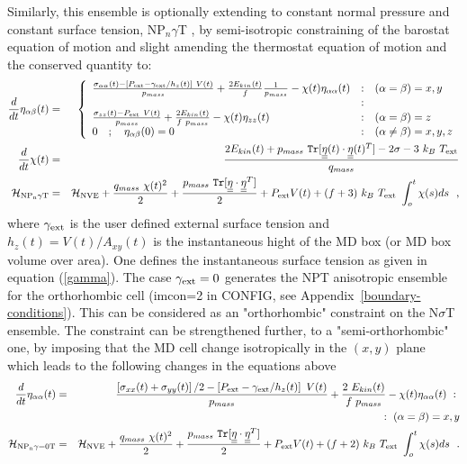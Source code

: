 Similarly, this ensemble is optionally extending to constant
normal pressure and constant surface tension, NP$_{n}\gamma$T
\cite{ikeguchi-04a}, by semi-isotropic constraining of the
barostat equation of motion and slight amending the thermostat
equation of motion and the conserved quantity to:
\begin{eqnarray}
\frac{d}{dt} \eta_{\alpha\beta}(t) &=& \left\{ \begin{array} {l@{\quad:\quad}l}
\frac{\sigma_{\alpha\alpha}(t) - \left[ P_{\rm ext} - \gamma_{\rm ext} / h_{z}(t) \right]~V(t)}{p_{mass}} +
\frac{2 E_{kin}(t)}{f} \frac{1}{p_{mass}} - \chi(t) \eta_{\alpha\alpha}(t) & (\alpha = \beta) = x,y \\
& \\
\frac{\sigma_{zz}(t) - P_{\rm ext}~V(t)}{p_{mass}} +
\frac{2 E_{kin}(t)}{f~p_{mass}} - \chi(t) \eta_{zz}(t) & (\alpha = \beta) = z \\
0~~~;~~~\eta_{\alpha\beta}(0) = 0 & (\alpha \ne \beta) = x,y,z
\end{array} \right. \nonumber \\
\frac{d}{dt} \chi(t) &=& \frac{2 E_{kin}(t) + p_{mass}~{\tt Tr}[\mat{\eta}(t) \cdot
\mat{\eta}(t)^{T}] - 2 \sigma - 3~k_{B}~T_{\rm ext}}{q_{mass}} \\
{\cal H}_{\rm NP_{n}\gamma T} &=& {\cal H}_{\rm NVE} + {q_{mass}~\chi (t)^{2} \over 2} +
{p_{mass}~{\tt Tr}[\mat{\eta} \cdot \mat{\eta}^{T}] \over 2} + P_{\rm ext} V(t) +
(f+3)~k_{B}~T_{\rm ext}~\int_o^t \chi (s) ds~~, \nonumber
\end{eqnarray}
where $\gamma_{\rm ext}$ is the user defined external surface tension
and $h_{z}(t) = V(t) / A_{xy}(t)$ is the instantaneous hight of the
MD box (or MD box volume over area).  One defines the instantaneous surface
tension as given in equation (\ref{gamma}).  The case $\gamma_{\rm ext}=0$
generates the NPT anisotropic ensemble for the orthorhombic cell
(imcon=2 in CONFIG, see Appendix~\ref{boundary-conditions}).  This
can be considered as an "orthorhombic" constraint on the N$\sigma$T ensemble.
The constraint can be strengthened further, to a "semi-orthorhombic" one, by
imposing that the MD cell change isotropically in the $(x,y)$ plane which
leads to the following changes in the equations above
\begin{eqnarray}
\frac{d}{dt} \eta_{\alpha\alpha}(t) &=& \frac{\left[\sigma_{xx}(t)+\sigma_{yy}(t)\right]/2 -
\left[ P_{\rm ext} - \gamma_{\rm ext} / h_{z}(t) \right]~V(t)}{p_{mass}} + \frac{2~E_{kin}(t)}{f~p_{mass}} -
\chi (t) \eta_{\alpha\alpha}(t)~:~\nonumber \\
 & & \phantom{xxxxxxxxxxxxxxxxxxxxxxxxxxxxxxxxxxxxxxxxx}~:~(\alpha = \beta) = x,y\\
{\cal H}_{\rm NP_{n}{\gamma}{=0}T} &=& {\cal H}_{\rm NVE} + {q_{mass}~\chi (t)^{2} \over 2} +
{p_{mass}~{\tt Tr}[\mbox{$\underline{\underline{\bf \eta}}$} \cdot \mbox{$\underline{\underline{\bf \eta}}$}^{T}] \over 2} + P_{\rm ext} V(t) +
(f+2)~k_{B}~T_{\rm ext}~\int_o^t \chi (s) ds~~.\nonumber
\end{eqnarray}

